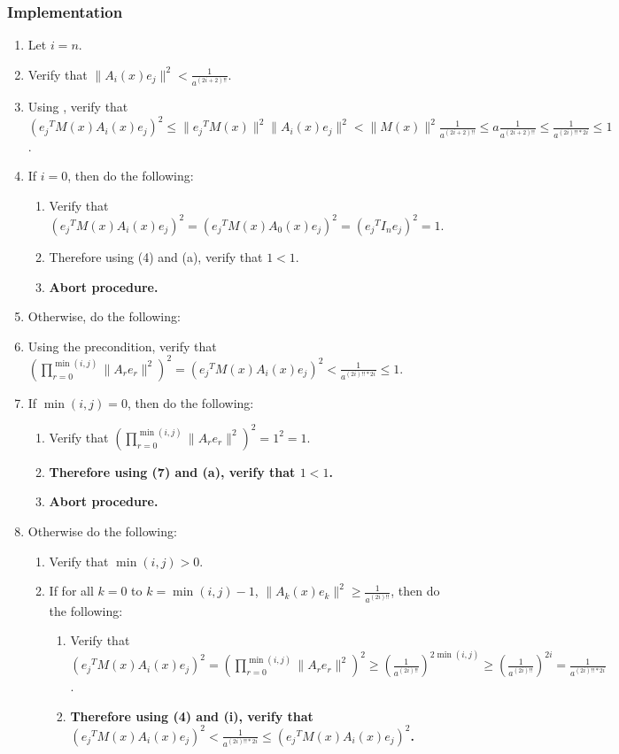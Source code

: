 \documentclass[twocolumn]{article}
\newcommand{\implementation}{\subsubsection*{Implementation}}
\newcommand{\procedurehr}[2][]{\hyperref[sec:procedure #2]{\ifthenelse{\equal{#1}{}}{procedure #2}{#1}}}
\begin{document}
			\implementation
				\begin{enumerate}
					\item Let $i=n$.
					\item Verify that $\lVert A_i(x)e_j\rVert^2<\frac{1}{a^{(2i+2)!!}}$.
					\item Using \procedurehr{3.70}, verify that $({e_j}^TM(x)A_i(x)e_j)^2\le\lVert{e_j}^TM(x)\rVert^2\lVert A_i(x)e_j\rVert^2<\lVert M(x)\rVert^2\frac{1}{a^{(2i+2)!!}}\le a\frac{1}{a^{(2i+2)!!}}\le\frac{1}{a^{(2i)!!*2i}}\le 1$.
					\item If $i=0$, then do the following:
					\begin{enumerate}
						\item Verify that $({e_j}^TM(x)A_i(x)e_j)^2=({e_j}^TM(x)A_0(x)e_j)^2=({e_j}^TI_ne_j)^2=1$.
						\item Therefore using (4) and (a), verify that $1<1$.
						\item \textbf{Abort procedure.}
					\end{enumerate}
					\item Otherwise, do the following:
					\item Using the precondition, verify that $(\prod_{r=0}^{\min(i,j)}\lVert A_re_r\rVert^2)^2=({e_j}^TM(x)A_i(x)e_j)^2<\frac{1}{a^{(2i)!!*2i}}\le 1$.
					\item If $\min(i,j)=0$, then do the following:
					\begin{enumerate}
						\item Verify that $(\prod_{r=0}^{\min(i,j)}\lVert A_re_r\rVert^2)^2=1^2=1$.
						\item \textbf{Therefore using (7) and (a), verify that $1<1$.}
						\item \textbf{Abort procedure.}
					\end{enumerate}
					\item Otherwise do the following:
					\begin{enumerate}
						\item Verify that $\min(i,j)>0$.
						\item If for all $k=0$ to $k=\min(i,j)-1$, $\lVert A_k(x)e_{k}\rVert^2\ge\frac{1}{a^{(2i)!!}}$, then do the following:
						\begin{enumerate}
							\item Verify that $({e_j}^TM(x)A_i(x)e_j)^2=(\prod_{r=0}^{\min(i,j)}\lVert A_re_r\rVert^2)^2\ge(\frac{1}{a^{(2i)!!}})^{2\min(i,j)}\ge(\frac{1}{a^{(2i)!!}})^{2i}=\frac{1}{a^{(2i)!!*2i}}$.
							\item \textbf{Therefore using (4) and (i), verify that $({e_j}^TM(x)A_i(x)e_j)^2<\frac{1}{a^{(2i)!!*2i}}\le ({e_j}^TM(x)A_i(x)e_j)^2$.}

\end{enumerate}
\end{enumerate}
\end{enumerate}
\end{document}
